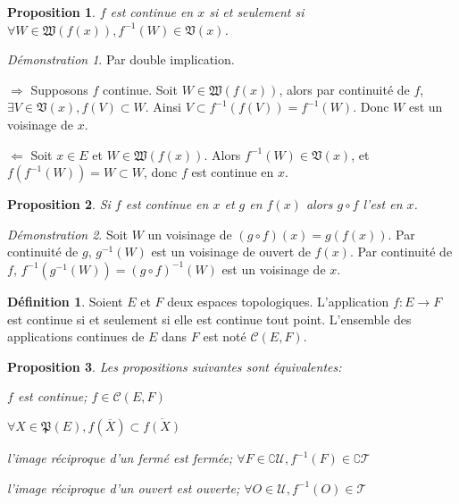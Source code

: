 \documentclass[a4paper, 11pt, french]{book}
\newenvironment{itemise}{\itemize}{\enditemize}
\theoremstyle{plain} %
\newtheorem{proposition}{Proposition}
\theoremstyle{definition} %
\newtheorem{definition}{Définition}
\theoremstyle{remark} %
\newtheorem*{demonstration}{Démonstration}
\newcommand{\1}{\mathds{1}}
\newcommand{\cont}{\mathcal{C}}
\newcommand{\inv}[1]{#1^{-1}}
\begin{document}
\begin{proposition}
	$f$ est continue en $x$ si et seulement si $\forall W\in\mathfrak{W}(f(x)), \inv{f}(W)\in\mathfrak{V}(x)$.
\end{proposition}

\begin{demonstration}
	Par double implication.
	\begin{itemise}
		\item[$\Rightarrow$] Supposons $f$ continue.
		Soit $W\in\mathfrak{W}(f(x))$, alors par continuité de $f$, $\exists V\in\mathfrak{V}(x), f(V)\subset W$.
		Ainsi $V\subset\inv{f}(f(V))=\inv{f}(W)$.
		Donc $W$ est un voisinage de $x$.
		\item[$\Leftarrow$] Soit $x\in E$ et $W\in\mathfrak{W}(f(x))$.
		Alors $\inv{f}(W)\in\mathfrak{V}(x)$, et $f(\inv{f}(W))=W\subset W$, donc $f$ est continue en $x$.
	\end{itemise}
\end{demonstration}

\begin{proposition}
	Si $f$ est continue en $x$ et $g$ en $f(x)$ alors $g\circ f$ l'est en $x$.
\end{proposition}

\begin{demonstration}
	Soit $W$ un voisinage de $(g\circ f)(x)=g(f(x))$.
	Par continuité de $g$, $\inv{g}(W)$ est un voisinage de ouvert de $f(x)$.
	Par continuité de $f$, $\inv{f}(\inv{g}(W))=\inv{(g\circ f)}(W)$ est un voisinage de $x$.
\end{demonstration}

\begin{definition}
	Soient $E$ et $F$ deux espaces topologiques.
	L'application $f\colon E\rightarrow F$ est continue si et seulement si elle est continue tout point.
	L'ensemble des applications continues de $E$ dans $F$ est noté $\mathcal{C}(E, F)$.
\end{definition}

\begin{proposition}
	Les propositions suivantes sont équivalentes:
	\begin{itemise}
		\item $f$ est continue; $f\in\cont(E, F)$
		\item $\forall X\in\mathfrak{P}(E), f(\overline{X})\subset\overline{f(X)}$
		\item l'image réciproque d'un fermé est fermée; $\forall F\in\complement\mathscr{U}, \inv{f}(F)\in\complement\mathscr{T}$
		\item l'image réciproque d'un ouvert est ouverte; $\forall O\in\mathscr{U}, \inv{f}(O)\in\mathscr{T}$
	\end{itemise}
\end{proposition}
\end{document}
